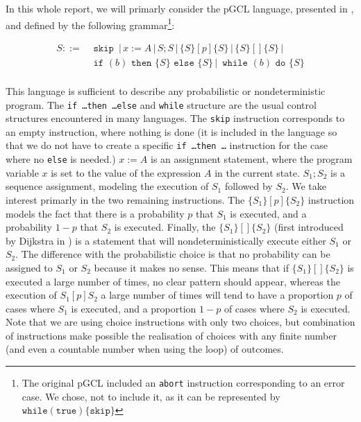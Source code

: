\documentclass[a4paper,10pt]{llncs}
\begin{document}
In this whole report, we will primarly consider the pGCL language, presented in \cite{McIver05}, and defined by the following grammar\footnote{The original pGCL included an \texttt{abort} instruction corresponding to an error case. We chose, not to include it, as it can be represented by $\texttt{while} (\texttt{true})\{ \texttt{skip} \}$}:


\begin{align*}
 S ::= & \texttt{ skip } \,|\, x := A \,|\, S;S \,|\, \{S\} [p] \{S\} \,|\, \{S\} [\!] \{S\} \,|\ \\
 & \texttt{ if } (b) \texttt{ then } \{ S \} \texttt{ else } \{ S \} \,|\, \texttt{ while }(b) \texttt{ do }\{S\} \\
\end{align*}

This language is sufficient to describe any probabilistic or nondeterministic program. The \texttt{if \dots then \dots else} and \texttt{while} structure are the usual control structures encountered in many languages. The \texttt{skip} instruction corresponds to an empty instruction, where nothing is done (it is included in the language so that we do not have to create a specific \texttt{if \dots then \dots} instruction for the case where no \texttt{else} is needed.) $x := A$ is an assignment statement, where the program variable $x$ is set to the value of the expression $A$ in the current state. $S_1 ; S_2$ is a sequence assignment, modeling the execution of $S_1$ followed by $S_2$. We take interest primarly in the two remaining instructions.\newline
The $\{S_1\} [p] \{S_2\}$ instruction models the fact that there is a probability $p$ that $S_1$ is executed, and a probability $1-p$ that $S_2$ is executed. Finally, the $\{S_1\} [\!] \{S_2\} $ (first introduced by Dijkstra in \cite{Dijkstra76}) is a statement that will nondeterministically execute either $S_1$ or $S_2$. The difference with the probabilistic choice is that no probability can be assigned to $S_1$ or $S_2$ because it makes no sense. This means that if $\{S_1\} [\!] \{S_2\} $ is executed a large number of times, no clear pattern should appear, whereas the execution of $S_1 [p] S_2$ a large number of times will tend to have a proportion $p$ of cases where $S_1$ is executed, and a proportion $1-p$ of cases where $S_2$ is executed.\newline
Note that we are using choice instructions with only two choices, but combination of instructions make possible the realisation of choices with any finite number (and even a countable number when using the loop) of outcomes.\bigskip
\end{document}
